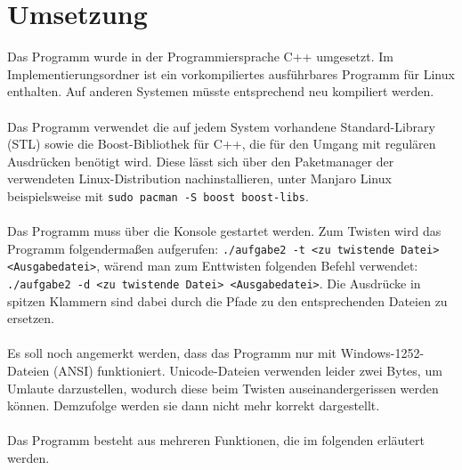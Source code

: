 \documentclass[a4paper, notitlepage, 12pt]{scrartcl}
\begin{document}
\section{Umsetzung}
Das Programm wurde in der Programmiersprache C++ umgesetzt. Im Implementierungsordner ist ein vorkompiliertes ausführbares Programm für Linux enthalten. Auf anderen Systemen müsste entsprechend neu kompiliert werden.  \\ \\
Das Programm verwendet die auf jedem System vorhandene Standard-Library (STL) sowie die Boost-Bibliothek für C++, die für den Umgang mit regulären Ausdrücken benötigt wird. Diese lässt sich über den Paketmanager der verwendeten Linux-Distribution nachinstallieren, unter Manjaro Linux beispielsweise mit \texttt{sudo pacman -S boost boost-libs}. \\ \\
Das Programm muss über die Konsole gestartet werden. Zum Twisten wird das Programm folgendermaßen aufgerufen: \texttt{./aufgabe2 -t <zu twistende Datei> <Ausgabedatei>}, wärend man zum Enttwisten folgenden Befehl verwendet: \texttt{./aufgabe2 -d <zu twistende Datei> <Ausgabedatei>}. Die Ausdrücke in spitzen Klammern sind dabei durch die Pfade zu den entsprechenden Dateien zu ersetzen. \\ \\
Es soll noch angemerkt werden, dass das Programm nur mit Windows-1252-Dateien (ANSI) funktioniert. Unicode-Dateien verwenden leider zwei Bytes, um Umlaute darzustellen, wodurch diese beim Twisten auseinandergerissen werden können. Demzufolge werden sie dann nicht mehr korrekt dargestellt. \\ \\
Das Programm besteht aus mehreren Funktionen, die im folgenden erläutert werden.
\end{document}
